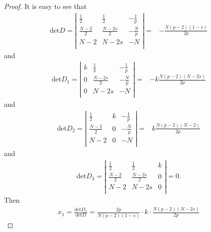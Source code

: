 \documentclass[12pt,a4paper,reqno]{amsart}
\numberwithin{equation}{section}
\begin{document}
\begin{proof}
It is easy to see that
\begin{equation*}
\begin{aligned}
\mathrm{det} D
=
\left|
\begin{matrix}
\frac{1}{2}&\frac{1}{2}&-\frac{1}{p}\\
\frac{N-2}{2}&\frac{N-2s}{2}&-\frac{N}{p}\\
N-2&N-2s&-N\\
\end{matrix}
\right|
=&-\frac{N(p-2)(1-s)}{2p}
\end{aligned}
\end{equation*}
and
\begin{equation*}
\begin{aligned}
\mathrm{det} D_{1}
=
\left|
\begin{matrix}
k&\frac{1}{2}&-\frac{1}{p}\\
0&\frac{N-2s}{2}&-\frac{N}{p}\\
0&N-2s&-N\\
\end{matrix}
\right|
=&-k\frac{N(p-2)(N-2s)}{2p}
\end{aligned}
\end{equation*}
and
\begin{equation*}
\begin{aligned}
\mathrm{det} D_{2}
=
\left|
\begin{matrix}
\frac{1}{2}&k&-\frac{1}{p}\\
\frac{N-2}{2}&0&-\frac{N}{p}\\
N-2&0&-N\\
\end{matrix}
\right|
=&k\frac{N(p-2)(N-2)}{2p}
\end{aligned}
\end{equation*}
and
\begin{equation*}
\begin{aligned}
\mathrm{det} D_{3}
=
\left|
\begin{matrix}
\frac{1}{2}&\frac{1}{2}&k\\
\frac{N-2}{2}&\frac{N-2s}{2}&0\\
N-2&N-2s&0\\
\end{matrix}
\right|
=
0.
\end{aligned}
\end{equation*}
Then
\begin{equation*}
\begin{aligned}
x_{1}=\frac{\mathrm{det} D_{1}}{\mathrm{det} D}
=
\frac{2p}{N(p-2)(1-s)}\cdot
k\cdot
\frac{N(p-2)(N-2s)}{2p}

\end{aligned}
\end{equation*}
\end{proof}
\end{document}

